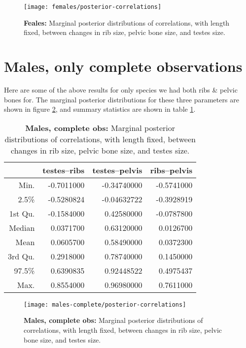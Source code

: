 \documentclass{article}
\begin{document}
\begin{figure}[ht]
  \begin{center}
    \texttt{[image: females/posterior-correlations]}
  \end{center}
  \caption{\textbf{Feales:} Marginal posterior distributions of correlations, with length fixed,
  between changes in rib size, pelvic bone size, and testes size.
  \label{fig:female_posterior_cors}
  }
\end{figure}

\section{Males, only complete observations}

Here are some of the above results for only species we had both ribs \& pelvic bones for.
The marginal posterior distributions for these three parameters
are shown in figure \ref{fig:males_complete_posterior_cors},
and summary statistics are shown in table \ref{tab:males_complete_posterior_cors}.

\begin{table}[ht]
\centering
\begin{tabular}{rrrr}
  \hline
        &  testes--ribs & testes--pelvis & ribs--pelvis \\
  \hline
 Min. &    -0.7011000  & -0.34740000  & -0.5741000 \\
 2.5\% &   -0.5280824  & -0.04632722  & -0.3928919 \\
 1st Qu. & -0.1584000  &  0.42580000  & -0.0787800 \\
 Median &   0.0371700  &  0.63120000  &  0.0126700 \\
 Mean &     0.0605700  &  0.58490000  &  0.0372300 \\
 3rd Qu. &  0.2918000  &  0.78740000  &  0.1450000 \\
 97.5\%  &  0.6390835  &  0.92448522  &  0.4975437 \\
 Max. &     0.8554000  &  0.96980000  &  0.7611000 \\
   \hline
\end{tabular}
\caption{\textbf{Males, complete obs:} Marginal posterior distributions of correlations, with length fixed,
  between changes in rib size, pelvic bone size, and testes size.
  \label{tab:males_complete_posterior_cors}
}
\end{table}


\begin{figure}[ht]
  \begin{center}
    \texttt{[image: males-complete/posterior-correlations]}
  \end{center}
  \caption{\textbf{Males, complete obs:} Marginal posterior distributions of correlations, with length fixed,
  between changes in rib size, pelvic bone size, and testes size.
  \label{fig:males_complete_posterior_cors}
  }
\end{figure}
\end{document}
